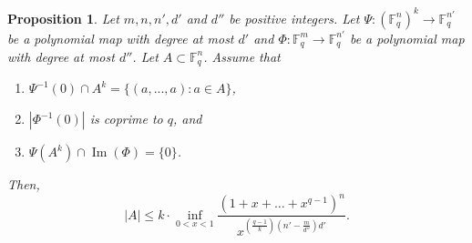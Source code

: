 \documentclass[11pt]{amsart}
\DeclareMathOperator{\Ima}{Im}
\newcommand{\F}{\mathbb{F}}
\newtheorem{proposition}[theorem]{Proposition}
\theoremstyle{definition}
\theoremstyle{remark}
\begin{document}
\begin{proposition}\label{thmB}
Let $m,n,n',d'$ and $d''$ be positive integers. Let $\Psi: (\mathbb{F}_q^n)^k \rightarrow \mathbb{F}_q^{n'}$ be a polynomial map with degree at most $d'$ and $\Phi:\mathbb{F}_q^m \rightarrow \mathbb{F}_q^{n'}$ be a polynomial map with degree at most $d''$.
Let $A \subset \F_q^n$. Assume that
    \begin{enumerate}[label=(\roman*)]
        \item $\Psi^{-1}(0)\cap A^k = \{ (a, ..., a) : a \in A \}$,
        \item $|\Phi^{-1}(0)|$ is coprime to $q$, and
        \item $\Psi(A^k) \cap \Ima(\Phi) = \{0\}$.
    \end{enumerate}
    Then,
	\begin{equation} \label{eq:prop}
		|A|\leq k \cdot \inf_{0<x<1}\frac{(1+x+\dots+x^{q-1})^n}{x^{\left(\frac{q-1}{k}\right)\left(n'-\frac{m}{d''}\right)d' }}.
	\end{equation}
\end{proposition}
\end{document}
